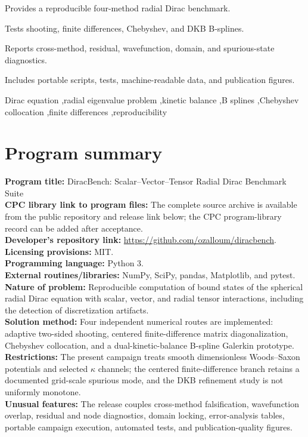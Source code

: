 \documentclass[a4paper,fleqn]{cas-dc}
\begin{document}
\begin{highlights}
\item Provides a reproducible four-method radial Dirac benchmark.
\item Tests shooting, finite differences, Chebyshev, and DKB B-splines.
\item Reports cross-method, residual, wavefunction, domain, and spurious-state diagnostics.
\item Includes portable scripts, tests, machine-readable data, and publication figures.
\end{highlights}

\begin{keywords}
Dirac equation \sep radial eigenvalue problem \sep kinetic balance \sep B splines \sep Chebyshev collocation \sep finite differences \sep reproducibility
\end{keywords}

\maketitle
\linenumbers
\RaggedRight

\section*{Program summary}
\noindent\textbf{Program title:} DiracBench: Scalar--Vector--Tensor Radial Dirac Benchmark Suite\\
\textbf{CPC library link to program files:} The complete source archive is available from the public repository and release link below; the CPC program-library record can be added after acceptance.\\
\textbf{Developer's repository link:} \url{https://github.com/ozalloum/diracbench}.\\
\textbf{Licensing provisions:} MIT.\\
\textbf{Programming language:} Python 3.\\
\textbf{External routines/libraries:} NumPy, SciPy, pandas, Matplotlib, and pytest.\\
\textbf{Nature of problem:} Reproducible computation of bound states of the spherical radial Dirac equation with scalar, vector, and radial tensor interactions, including the detection of discretization artifacts.\\
\textbf{Solution method:} Four independent numerical routes are implemented: adaptive two-sided shooting, centered finite-difference matrix diagonalization, Chebyshev collocation, and a dual-kinetic-balance B-spline Galerkin prototype.\\
\textbf{Restrictions:} The present campaign treats smooth dimensionless Woods--Saxon potentials and selected $\kappa$ channels; the centered finite-difference branch retains a documented grid-scale spurious mode, and the DKB refinement study is not uniformly monotone.\\
\textbf{Unusual features:} The release couples cross-method falsification, wavefunction overlap, residual and node diagnostics, domain locking, error-analysis tables, portable campaign execution, automated tests, and publication-quality figures.
\end{document}

